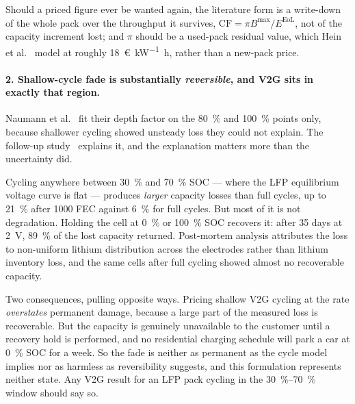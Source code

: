 \documentclass[11pt,a4paper]{article}
\begin{document}
Should a priced figure ever be wanted again, the literature form is a
write-down of the whole pack over the throughput it survives,
$\mathrm{CF} = \pi B^{\max} / E^{\mathrm{EoL}}$, not of the capacity
increment lost; and $\pi$ should be a used-pack residual value, which
Hein et al.~\cite{hein2012} model at roughly
\SI{18}{\euro\per\kilo\watt\hour}, rather than a new-pack price.

\paragraph{2. Shallow-cycle fade is substantially \emph{reversible},
and V2G sits in exactly that region.}
Naumann et al.~\cite{naumann2020} fit their depth factor on the
\SI{80}{\percent} and \SI{100}{\percent} points only, because
shallower cycling showed unsteady loss they could not explain. The
follow-up study~\cite{spingler2020} explains it, and the explanation
matters more than the uncertainty did.

Cycling anywhere between \SI{30}{\percent} and \SI{70}{\percent} SOC
--- where the LFP equilibrium voltage curve is flat --- produces
\emph{larger} capacity losses than full cycles, up to
\SI{21}{\percent} after 1000 FEC against \SI{6}{\percent} for full
cycles. But most of it is not degradation. Holding the cell at
\SI{0}{\percent} or \SI{100}{\percent} SOC recovers it: after 35 days
at \SI{2}{\volt}, \SI{89}{\percent} of the lost capacity returned.
Post-mortem analysis attributes the loss to non-uniform lithium
distribution across the electrodes rather than lithium inventory loss,
and the same cells after full cycling showed almost no recoverable
capacity.

Two consequences, pulling opposite ways. Pricing shallow V2G cycling
at the \cite{naumann2020} rate \emph{overstates} permanent damage,
because a large part of the measured loss is recoverable. But the
capacity is genuinely unavailable to the customer until a recovery
hold is performed, and no residential charging schedule will park a
car at \SI{0}{\percent} SOC for a week. So the fade is neither as
permanent as the cycle model implies nor as harmless as reversibility
suggests, and this formulation represents neither state. Any V2G
result for an LFP pack cycling in the \SIrange{30}{70}{\percent}
window should say so.
\end{document}
